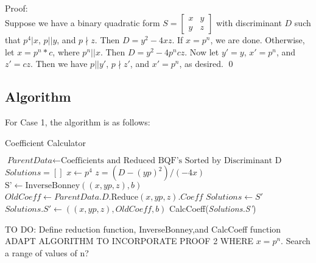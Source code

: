 \documentclass[11pt, oneside]{amsart}
\begin{document}
\\
Proof:
\\
Suppose we have a binary quadratic form $S=
\begin{bmatrix}
x &	y \\
y & z
\end{bmatrix}$ with discriminant $D$ such that $p^4\vert x$, $p\vert \vert y$, and $p\nmid z$. Then $D=y^2-4xz$. If $x=p^n$, we are done. Otherwise, let $x=p^n*c$, where $p^n\vert \vert x$. Then $D=y^2-4p^ncz$. Now let $y'=y$, $x'=p^n$, and $z'=cz$. Then we have $p\vert \vert y'$, $p\nmid z'$, and $x'=p^n$, as desired. \qed

\subsection{Algorithm}
For Case 1, the algorithm is as follows:
\begin{algorithm}[H]
\caption{Coefficient Calculator}\label{euclid}
\begin{algorithmic}[1]
\State $\textit{ParentData} \gets \text{Coefficients and Reduced BQF's Sorted by Discriminant D}$
\State $\textit{Solutions} = []$
        \State $\textit{x} \gets p^4$
                    \State $\textit{z} = (D-(yp)^2)/(-4x)$
                        \State $\text{S'} \gets \text{InverseBonney}((x,yp,z), b)$
                        \State $\textit{OldCoeff} \gets \textit{ParentData.D.}\text{Reduce}(x,yp,z).Coeff$
                            \State $\textit{Solutions} \gets S'$
                        \EndIf
                            \State $\textit{Solutions}.S' \gets ((x,yp,z), OldCoeff, b)$
                        \EndIf
                    \EndIf
                \EndIf
    \EndFor
\EndFor
\EndIf
\EndFor
{}
    \State CalcCoeff(\textit{Solutions.S'})
\EndIf
\EndFor
\EndProcedure
\end{algorithmic}
\end{algorithm}

TO DO: Define reduction function, InverseBonney,and CalcCoeff function
ADAPT ALGORITHM TO INCORPORATE PROOF 2 WHERE $x=p^n$. Search a range of values of n?
\end{document}
